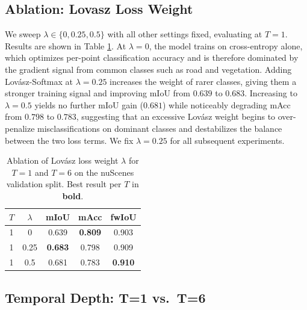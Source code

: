 \documentclass[10pt,twocolumn,letterpaper]{article}
\begin{document}

\subsection{Ablation: Lovasz Loss Weight}
We sweep $\lambda \in \{0, 0.25, 0.5\}$ with all other settings fixed, evaluating at $T=1$. Results are shown in Table \ref{tab:lovasz_ablation}. At $\lambda=0$, the model trains on cross-entropy alone, which optimizes per-point classification accuracy and is therefore dominated by the gradient signal from common classes such as road and vegetation. Adding Lovász-Softmax at $\lambda=0.25$ increases the weight of rarer classes, giving them a stronger training signal and improving mIoU from $0.639$ to $0.683$. Increasing to $\lambda=0.5$ yields no further mIoU gain ($0.681$) while noticeably degrading mAcc from $0.798$ to $0.783$, suggesting that an excessive Lovász weight begins to over-penalize misclassifications on dominant classes and destabilizes the balance between the two loss terms. We fix $\lambda=0.25$ for all subsequent experiments.

\begin{table}
\begin{center}
\begin{tabular}{|c|c|c|c|c|}
\hline
$T$ & $\lambda$ & mIoU & mAcc & fwIoU \\
\hline\hline
1 & 0    & 0.639 & \textbf{0.809} & 0.903 \\
1 & 0.25 & \textbf{0.683} & 0.798 & 0.909 \\
1 & 0.5  & 0.681 & 0.783 & \textbf{0.910} \\
\hline
\end{tabular}
\end{center}
\caption{Ablation of Lovász loss weight $\lambda$ for $T=1$ and $T=6$ on the nuScenes validation split. Best result per $T$ in \textbf{bold}.}
\label{tab:lovasz_ablation}
\end{table}

\subsection{Temporal Depth: T=1 vs.\ T=6}
\label{sec:temporal_depth}
\end{document}
